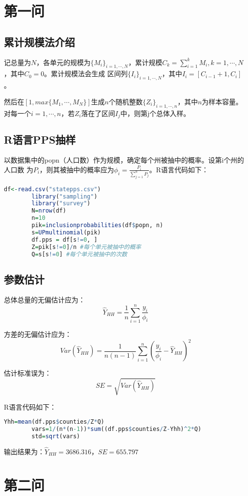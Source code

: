 \documentclass[a4paper,12pt]{article}
\begin{document}
	\section{第一问}
	\subsection{累计规模法介绍}
	记总量为$N$，各单元的规模为$\{M_i\}_{i=1,\cdots,N}$，累计规模$C_k=\sum_{i=1}^{k}M_i,k=1,\cdots,N$，其中$C_0=0$。累计规模法会生成
	区间列$\{I_i\}_{i=1,\cdots,N}$，其中$I_i=[C_{i-1}+1,C_{i}]$。

	然后在$[1,max\{M_1,\cdots,M_N\}]$生成$n$个随机整数$\{Z_i\}_{i=1,\cdots,n}$，其中$n$为样本容量。
	对每一个$i=1,\cdots,n$，若$Z_i$落在了区间$I_j$中，则第j个总体入样。
	\subsection{R语言PPS抽样}

    以数据集中的popn（人口数）作为规模，确定每个州被抽中的概率。设第i个州的人口数
    为$P_i$，则其被抽中的概率应为$\phi_i=\frac{P_i}{\sum_{j=1}^{n}P_j}$。R语言代码如下：

	\begin{lstlisting}[language=r,breaklines]
		df<-read.csv("statepps.csv")
		library("sampling")
		library("survey")
		N=nrow(df)
		n=10
		pik=inclusionprobabilities(df$popn, n)
		s=UPmultinomial(pik)
		df.pps = df[s!=0, ]
		Z=pik[s!=0]/n #每个单元被抽中的概率
		Q=s[s!=0] #每个单元被抽中的次数
	\end{lstlisting}
	
	\subsection{参数估计}
	
	总体总量的无偏估计应为：
	$$\hat{Y}_{HH}=\frac{1}{n}\sum_{i=1}^{n}\frac{y_i}{\phi_i}$$

	方差的无偏估计应为：
	$$Var(\hat{Y}_{HH})=\frac{1}{n(n-1)}\sum_{i=1}^{n}(\frac{y_i}{\phi_i}-\hat{Y}_{HH})^2$$

	估计标准误为：
	$$SE=\sqrt{Var(\hat{Y}_{HH})}$$

	R语言代码如下：
	\begin{lstlisting}[language=r,breaklines]
		Yhh=mean(df.pps$counties/Z*Q)
		vars=1/(n*(n-1))*sum((df.pps$counties/Z-Yhh)^2*Q)
		std=sqrt(vars)
	\end{lstlisting}
	输出结果为：$\hat{Y}_{HH}=3686.316$，$SE=655.797$
	\section{第二问}
\end{document}
